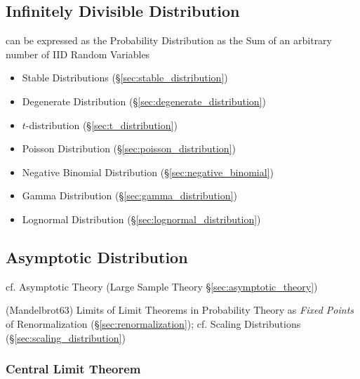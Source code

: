 \subsection{Infinitely Divisible Distribution}
\label{sec:infinitely_divisible}

can be expressed as the Probability Distribution as the Sum of an arbitrary
number of IID Random Variables

\begin{itemize}
  \item Stable Distributions (\S\ref{sec:stable_distribution})
  \item Degenerate Distribution (\S\ref{sec:degenerate_distribution})
  \item $t$-distribution (\S\ref{sec:t_distribution})
  \item Poisson Distribution (\S\ref{sec:poisson_distribution})
  \item Negative Binomial Distribution (\S\ref{sec:negative_binomial})
  \item Gamma Distribution (\S\ref{sec:gamma_distribution})
  \item Lognormal Distribution (\S\ref{sec:lognormal_distribution})
\end{itemize}



\subsection{Asymptotic Distribution}\label{sec:asymptotic_distribution}

\fist cf. Asymptotic Theory (Large Sample Theory \S\ref{sec:asymptotic_theory})

(Mandelbrot63) Limits of Limit Theorems in Probability Theory as \emph{Fixed
  Points} of Renormalization (\S\ref{sec:renormalization}); cf. Scaling
Distributions (\S\ref{sec:scaling_distribution})



\subsubsection{Central Limit Theorem}\label{sec:central_limit}

